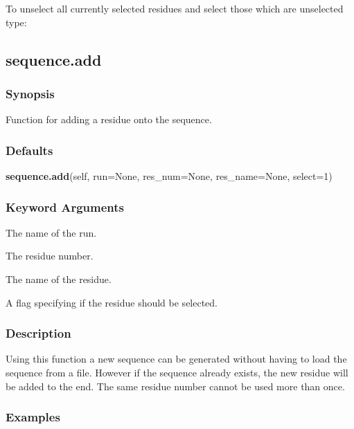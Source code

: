  To unselect all currently selected residues and select those which are unselected type: 
  


  

 \newpage 

 \subsection{sequence.add} 

  
 \subsubsection{Synopsis} 

 Function for adding a residue onto the sequence. 
  

  
 \subsubsection{Defaults} 

 \textsf{\textbf{sequence.add}(self, run=None, res\_num=None, res\_name=None, select=1)} 

  
 \subsubsection{Keyword Arguments} 

   The name of the run.   

   The residue number.   

   The name of the residue.   

   A flag specifying if the residue should be selected.  

  

  
 \subsubsection{Description} 

 Using this function a new sequence can be generated without having to load the sequence from a file.  However if the sequence already exists, the new residue will be added to the end. The same residue number cannot be used more than once. 
  

  
 \subsubsection{Examples} 


